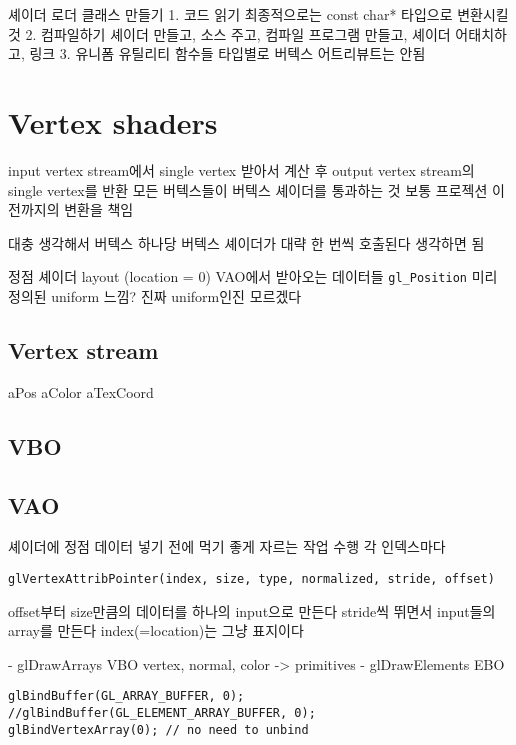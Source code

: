 \documentclass[a4paper]{report}
\begin{document}
셰이더 로더 클래스 만들기
1. 코드 읽기
	최종적으로는 const char* 타입으로 변환시킬 것
2. 컴파일하기
	셰이더 만들고, 소스 주고, 컴파일
	프로그램 만들고, 셰이더 어태치하고, 링크
3. 유니폼 유틸리티 함수들 타입별로
	버텍스 어트리뷰트는 안됨


\section{Vertex shaders}
input vertex stream에서 single vertex 받아서 계산 후 output vertex stream의 single vertex를 반환
모든 버텍스들이 버텍스 셰이더를 통과하는 것
보통 프로젝션 이전까지의 변환을 책임

대충 생각해서 버텍스 하나당 버텍스 셰이더가 대략 한 번씩 호출된다 생각하면 됨

정점 셰이더
layout (location = 0)
VAO에서 받아오는 데이터들
\verb|gl_Position|
미리 정의된 uniform 느낌?
진짜 uniform인진 모르겠다


\subsection{Vertex stream}

aPos aColor aTexCoord

\subsection{VBO}

\subsection{VAO}

셰이더에 정점 데이터 넣기 전에 먹기 좋게 자르는 작업 수행
각 인덱스마다

\begin{lstlisting}
glVertexAttribPointer(index, size, type, normalized, stride, offset)
\end{lstlisting}

offset부터 size만큼의 데이터를 하나의 input으로 만든다
stride씩 뛰면서 input들의 array를 만든다
index(=location)는 그냥 표지이다



- glDrawArrays
	VBO
	vertex, normal, color -> primitives
- glDrawElements
	EBO

\begin{lstlisting}
glBindBuffer(GL_ARRAY_BUFFER, 0);
//glBindBuffer(GL_ELEMENT_ARRAY_BUFFER, 0);
glBindVertexArray(0); // no need to unbind
\end{lstlisting}
\end{document}
